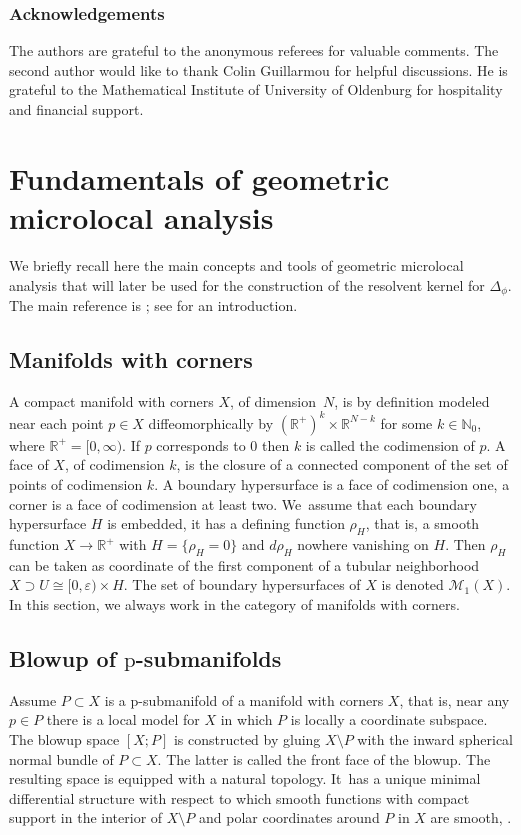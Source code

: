 \documentclass[JEP,XML,SOM,Unicode,NoFloatCountersInSection,published]{cedram}
\let\backslash\setminus
\newcommand{\rp}{\mathrm{p}}
\theoremstyle{plain}
\theoremstyle{definition}
\newcommand{\R}{{\mathbb{R}}}
\newcommand\calM{{\mathcal M}}
\let\eps\varepsilon
\begin{document}
\subsubsection*{Acknowledgements}
The authors are grateful to the anonymous referees for valuable comments. The second author would like to thank Colin Guillarmou
for helpful discussions. He is grateful to the Mathematical Institute of University of Oldenburg for hospitality and financial support.

\section{Fundamentals of geometric microlocal analysis}\label{sec:fund}
We briefly recall here the main concepts and tools of geometric microlocal analysis that will later be used
for the construction of the resolvent kernel for $\Delta_{\phi}$. The main reference
is \cite{melrose1993atiyah}; see \cite{Gri:BBC} for an introduction.

\subsection{Manifolds with corners}
A compact manifold with corners $X$, of dimension~$N$, is by definition modeled near each point $p\in X$ diffeomorphically by
\hbox{$(\mathbb{R}^+)^{k}\times\mathbb{R}^{N-k}$} for some $k \in \mathbb{N}_0$, where $\R^+=[0,\infty)$.
If $p$ corresponds to $0$ then $k$ is called the codimension of $p$. A face of $X$, of codimension $k$, is the closure of a connected component of the set of points of codimension $k$. A boundary hypersurface is a face of codimension one, a corner is a face of codimension at least two.
We~assume that each boundary hypersurface $H$ is embedded, \ie it has a defining function $\rho_H$, that is, a smooth function $X\to\R^+$ with
$H = \{\rho_H = 0\}$ and $d\rho_H$ nowhere vanishing on $H$. Then $\rho_H$ can be taken as coordinate of
the first component of a tubular neighborhood $X\supset U\cong [0,\eps)\times H$.
The set of boundary hypersurfaces of $X$ is denoted $\calM_1(X)$.
In this section, we
always work in the category of manifolds with corners.

\subsection{Blowup of \texorpdfstring{$\rp$}{p}-submanifolds}
Assume $P \subset X$ is a p-submanifold of a manifold
with corners $X$, that is, near any $p\in P$ there is a local model for $X$ in which $P$ is locally a coordinate subspace. The blowup space $[X;P]$ is constructed by gluing
$X\backslash P$ with the inward spherical normal bundle of $P \subset X$. The latter is called the front face of the blowup.
The resulting space is equipped with a natural topology. It~has a unique minimal
differential structure with respect to which smooth functions with compact support in the
interior of $X\backslash P$ and polar coordinates around $P$ in $X$ are smooth, \cf \cite[\S 4.1]{melrose1993atiyah}.
\end{document}
